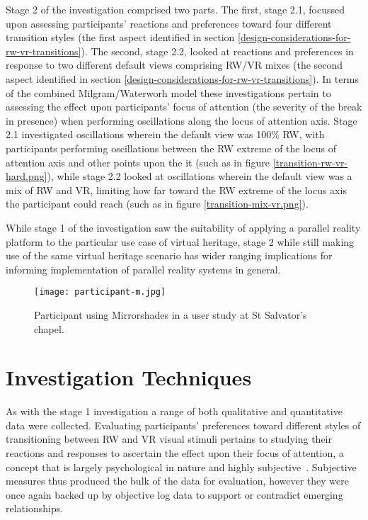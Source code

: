Stage 2 of the investigation comprised two parts. The first, stage 2.1, focussed upon assessing participants' reactions and preferences toward four different transition styles (the first aspect identified in section \ref{design-considerations-for-rw-vr-transitions}). The second, stage 2.2, looked at reactions and preferences in response to two different default views comprising RW/VR mixes (the second aspect identified in section \ref{design-considerations-for-rw-vr-transitions}). In terms of the combined Milgram/Waterworh model these investigations pertain to assessing the effect upon participants' focus of attention (the severity of the break in presence) when performing oscillations along the locus of attention axis. Stage 2.1 investigated oscillations wherein the default view was 100\% RW, with participants performing oscillations between the RW extreme of the locus of attention axis and other points upon the it (such as in figure \ref{transition-rw-vr-hard.png}), while stage 2.2 looked at oscillations wherein the default view was a mix of RW and VR, limiting how far toward the RW extreme of the locus axis the participant could reach (such as in figure \ref{transition-mix-vr.png}).

While stage 1 of the investigation saw the suitability of applying a parallel reality platform to the particular use case of virtual heritage, stage 2 while still making use of the same virtual heritage scenario has wider ranging implications for informing implementation of parallel reality systems in general.

\begin{figure}[ht]
	\begin{center}
		\texttt{[image: participant-m.jpg]}
		\caption{Participant using Mirrorshades in a user study at St Salvator's chapel.}
		\label{participant-m.jpg}
	\end{center}
\end{figure}


\section{Investigation Techniques}

As with the stage 1 investigation a range of both qualitative and quantitative data were collected. Evaluating participants' preferences toward different styles of transitioning between RW and VR visual stimuli pertains to studying their reactions and responses to ascertain the effect upon their focus of attention, a concept that is largely psychological in nature and highly subjective~\cite{Ijsselsteijn2001}. Subjective measures thus produced the bulk of the data for evaluation, however they were once again backed up by objective log data to support or contradict emerging relationships.

